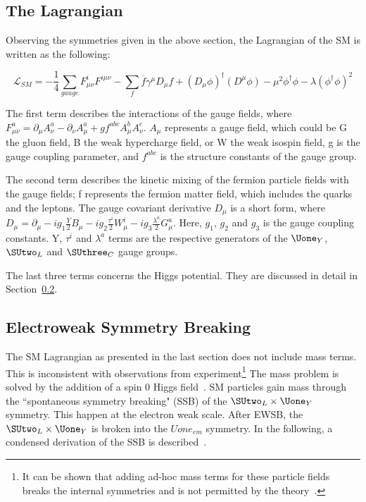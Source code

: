 \subsection{The Lagrangian}

Observing the symmetries given in the above section, the Lagrangian of the SM is written as the following:

\begin{equation}
    \mathcal{L}_{SM}= - \frac{1}{4} \sum\limits_{gauge} F^{i}_{\mu \nu}F^{i\mu\nu} - \sum\limits_{f} \overline{f} \gamma^{\mu} D_{\mu} f +(D_{\mu}\phi)^{\dagger}(D^{\mu}\phi) - \mu^{2}\phi^{\dagger}\phi - \lambda(\phi^{\dagger}\phi)^{2}
    \label{eq:SMLagrangian}
\end{equation}

The first term describes the interactions of the gauge fields, where $F^{a}_{\mu\nu}=\partial_{\mu}A_{\nu}^{a}-\partial_{\nu}A_{\mu}^{a}+g f^{abc}A^{b}_{\mu}A^{c}_{\nu}$. $A_{\mu}$ represents a gauge field, which could be G the gluon field, B the weak hypercharge field, or W the weak isospin field, g is the gauge coupling parameter, and $f^{abc}$ is the structure constants of the gauge group. 

The second term describes the kinetic mixing of the fermion particle fields with the gauge fields; f represents the fermion matter field, which includes the quarks and the leptons. The gauge covariant derivative $D_{\mu}$ is a short form, where $D_{\mu}=\partial_{\mu}-i g_{1} \frac{Y}{2}B_{\mu} - i g_{2}\frac{\tau ^{i}}{2}W_{\mu}^{i} - ig_{3}\frac{\lambda^{a}}{2}G^{a}_{\mu}$. Here, $g_{1}$, $g_{2}$ and $g_{3}$ is the gauge coupling constants. Y, $\tau ^{i}$ and $\lambda^{a}$ terms are the respective generators of the $\Uone_{Y}$, $\SUtwo_{L}$ and $\SUthree_{C}$ gauge groups.

The last three terms concerns the Higgs potential. They are discussed in detail in Section~\ref{sec:SSB}.

\subsection{Electroweak Symmetry Breaking}
\label{sec:SSB}
The SM Lagrangian as presented in the last section does not include mass terms. This is inconsistent with observations from experiment\footnote{It can be shown that adding ad-hoc mass terms for these particle fields breaks the internal symmetries and is not permitted by the theory~\cite{peskin2018introduction}.} The mass problem is solved by the addition of a spin 0 Higgs field~\cite{higgs1964broken}. SM particles gain mass through the ``spontaneous symmetry breaking" (SSB) of the $\SUtwo_{L} \times \Uone_{Y}$ symmetry. This happen at the electron weak scale. After EWSB, the $\SUtwo_{L} \times \Uone_{Y}$ is broken into the $Uone_{em}$ symmetry. In the following, a condensed derivation of the SSB is described~\cite{peskin2018introduction}.


